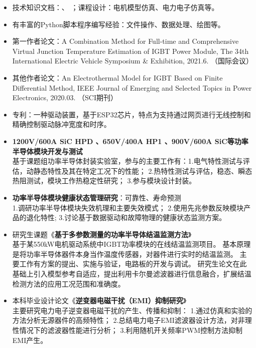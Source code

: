 \documentclass[zh]{resume}
\begin{document}
\begin{itemize}
  \item 技术知识文档：、
  ；课程设计：电机模型仿真、电力电子仿真等。
  \item 有丰富的Python脚本程序编写经验：文件操作、数据处理、绘图等。
  \item 第一作者论文：{\small A Combination Method for Full-time and Comprehensive Virtual Junction Temperature Estimation of IGBT Power Module, The 34th International Electric Vehicle Symposium \& Exhibition, 2021.6. （国际会议）}
  \item 其他作者论文：{\small An Electrothermal Model for IGBT Based on Finite Differential Method, IEEE Journal of Emerging and Selected Topics in Power Electronics, 2020.03. 
  （SCI期刊） }
  \item 专利：一种驱动装置，基于ESP32芯片，特点为支持通过网页进行无线控制和精确控制驱动脉冲宽度和时序。
\end{itemize}

\begin{itemize}
  \item \textbf{1200V/600A SiC HPD 、650V/400A HP1 、900V/600A SiC等功率半导体模块开发与测试}\\
  {\small 基于课题组功率半导体封装实验室，参与的主要工作有：1.电气特性测试与评估，动静态特性及其在特定工况下的性能；
  2.热特性测试与评估，稳态、瞬态热阻测试，模块工作热稳定性研究；
  3.参与模块设计封装。}
  \item \textbf{功率半导体模块健康状态管理研究}：可靠性、寿命预测\\ 
  {\small 1.调研功率半导体模块失效机理和主要失效模式；
  2.使用先兆参数反映模块产品的退化特性;
  3.讨论基于数据驱动和故障物理的健康状态监测方案。}
  \item 研究生课题《\textbf{基于多参数测量的功率半导体结温监测方法}》\\
  {\small 基于某550kW电机驱动系统中IGBT功率模块的在线结温监测项目。
  基本原理是将功率半导体器件本身当作温度传感器，对器件进行实时的结温监测。
  主要工作有方案的提出、实施与验证，电路板的开发与调试。
  研究生论文在此基础上引入模型参考自适应，提出利用卡尔曼滤波器进行信息融合，扩展结温检测方法的应用工况范围和准确度。}
  \item 本科毕业设计论文《\textbf{逆变器电磁干扰（EMI）抑制研究}》\\ 
  {\small 主要研究电力电子逆变器电磁干扰的产生、传播和抑制：
  1.通过仿真和实验的方法分析无源器件的高频特性；
  2.总结电力电子EMI滤波器设计方法，对非理性情况下的滤波器性能进行分析；
  3.利用随机开关频率PWM控制方法抑制EMI产生。}
  
\end{itemize}
\end{document}

